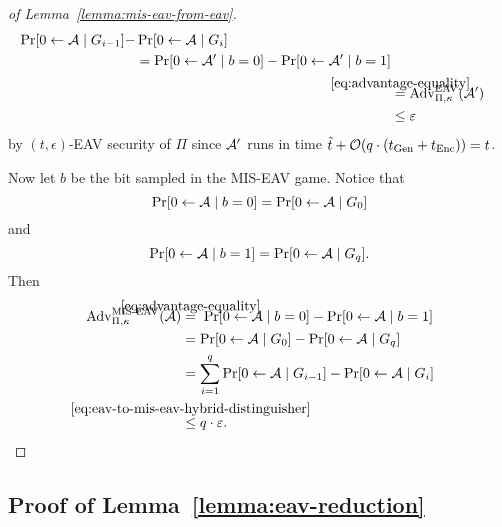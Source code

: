 \begin{proof}[of Lemma~\ref{lemma:mis-eav-from-eav}]
\begin{align}
		\begin{split}
			\begin{split}
				\pr{0 \from \adv \mid G_{i - 1}} - & \pr{0 \from \adv \mid G_{i}} \\
				& = \pr{0 \from \adv' \mid b = 0} - \pr{0 \from \adv' \mid b = 1}
			\end{split} \\
			& \stackrel{\mathclap{\eqref{eq:advantage-equality}}}{=} \advantage{\Pi}{\kappa}{EAV}(\adv')                                         \\
			& \le \epsilon
		\end{split}
	\end{align}
	by $(t, \epsilon)$-EAV security of $\Pi$ since $\mathcal{A}'$ runs in time $\tilde{t} + \mathcal{O}(q \cdot (t_{\mathrm{Gen}} + t_{\mathrm{Enc}})) = t$.

	Now let $b$ be the bit sampled in the MIS-EAV game. Notice that
	\[
		\pr{0 \from \adv \mid b = 0} = \pr{0 \from \adv \mid G_0}
	\]
	and
	\[
		\pr{0 \from \adv \mid b = 1} = \pr{0 \from \adv \mid G_q}.
	\]
	Then
	\begin{align*}
		\advantage{\Pi}{\kappa}{MIS\text{-}EAV}(\adv) & \stackrel{\mathclap{\eqref{eq:advantage-equality}}}{=} \; \pr{0 \from \adv \mid b = 0} - \pr{0 \from \adv \mid b = 1} \\
		                                       & = \pr{0 \from \adv \mid G_0} - \pr{0 \from \adv \mid G_q}                                                             \\
		                                       & = \sum_{i = 1}^{q} \pr{0 \from \adv \mid G_{i - 1}} - \pr{0 \from \adv \mid G_i}                                      \\
		                                       & \stackrel{\mathclap{\eqref{eq:eav-to-mis-eav-hybrid-distinguisher}}}{\le} q \cdot \epsilon.
	\end{align*}
\end{proof}

\subsection{Proof of Lemma~\ref{lemma:eav-reduction}} \label{sec:eav-reduction-proof}

